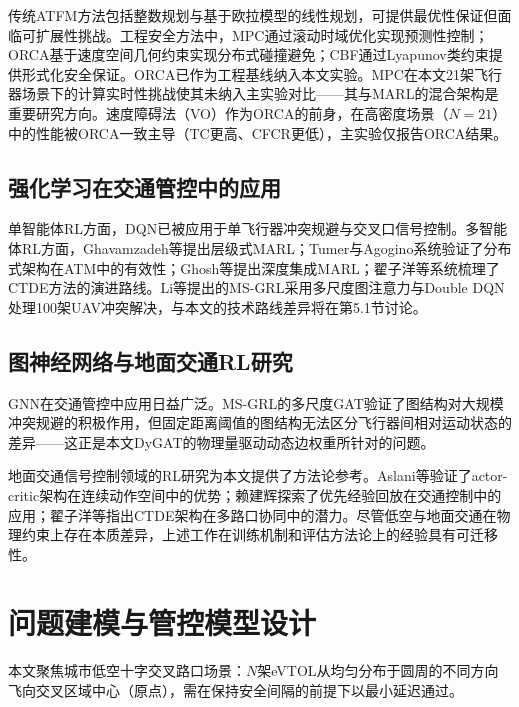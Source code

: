 \documentclass[12pt,a4paper,UTF8]{ctexart}
\begin{document}
传统ATFM方法包括整数规划与基于欧拉模型的线性规划\cite{ref2}，可提供最优性保证但面临可扩展性挑战。工程安全方法中，MPC\cite{ref3}通过滚动时域优化实现预测性控制；ORCA\cite{ref4}基于速度空间几何约束实现分布式碰撞避免；CBF\cite{ref5}通过Lyapunov类约束提供形式化安全保证。ORCA已作为工程基线纳入本文实验。MPC在本文21架飞行器场景下的计算实时性挑战使其未纳入主实验对比——其与MARL的混合架构是重要研究方向。速度障碍法（VO）作为ORCA的前身，在高密度场景（$N=21$）中的性能被ORCA一致主导（TC更高、CFCR更低），主实验仅报告ORCA结果。

\subsection{强化学习在交通管控中的应用}

单智能体RL方面，DQN已被应用于单飞行器冲突规避与交叉口信号控制\cite{ref12,ref15,ref16,ref17,ref18,ref19,ref20,ref21,ref22}。多智能体RL方面，Ghavamzadeh等\cite{ref23}提出层级式MARL；Tumer与Agogino\cite{ref7,ref14,ref24}系统验证了分布式架构在ATM中的有效性；Ghosh等\cite{ref9}提出深度集成MARL；翟子洋等\cite{ref13}系统梳理了CTDE方法的演进路线。Li等\cite{ref10}提出的MS-GRL采用多尺度图注意力与Double DQN处理100架UAV冲突解决，与本文的技术路线差异将在第5.1节讨论。

\subsection{图神经网络与地面交通RL研究}

GNN在交通管控中应用日益广泛。MS-GRL\cite{ref10}的多尺度GAT验证了图结构对大规模冲突规避的积极作用，但固定距离阈值的图结构无法区分飞行器间相对运动状态的差异——这正是本文DyGAT的物理量驱动动态边权重所针对的问题。

地面交通信号控制领域的RL研究为本文提供了方法论参考。Aslani等\cite{ref12}验证了actor-critic架构在连续动作空间中的优势；赖建辉\cite{ref17}探索了优先经验回放在交通控制中的应用；翟子洋等\cite{ref13}指出CTDE架构在多路口协同中的潜力。尽管低空与地面交通在物理约束上存在本质差异，上述工作在训练机制和评估方法论上的经验具有可迁移性。

\section{问题建模与管控模型设计}

本文聚焦城市低空十字交叉路口场景：$N$架eVTOL从均匀分布于圆周的不同方向飞向交叉区域中心（原点），需在保持安全间隔的前提下以最小延迟通过。
\end{document}
